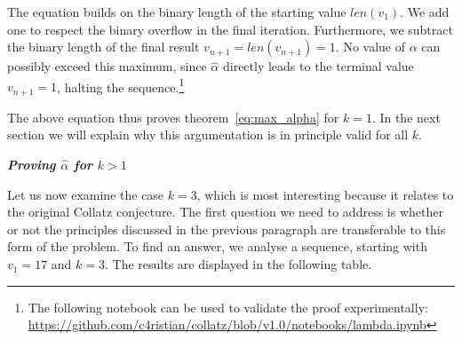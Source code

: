 \documentclass{SciPress_2015}
\renewcommand{\subsection}[1]{\textit{\textbf{#1}}}
\begin{document}
The equation builds on the binary length of the starting value $len(v_1)$. We add one to respect the binary overflow in the final iteration. Furthermore, we subtract the binary length of the final result $v_{n+1}=len(v_{n+1})=1$. No value of $\alpha$ can possibly exceed this maximum, since $\hat\alpha$ directly leads to the terminal value $v_{n+1}=1$, halting the sequence.\footnote{The following notebook can be used to validate the proof experimentally:\\ \hspace*{7mm}\url{https://github.com/c4ristian/collatz/blob/v1.0/notebooks/lambda.ipynb}}

\par\medskip
The above equation thus proves theorem~\ref{eq:max_alpha} for $k=1$. In the next section we will explain why this argumentation is in principle valid for all $k$.

\vspace{1em}\noindent
\subsection{Proving \boldmath$\hat\alpha$ for \boldmath$k>1$}
\par\noindent
Let us now examine the case $k=3$, which is most interesting because it relates to the original Collatz conjecture. The first question we need to address is whether or not the principles discussed in the previous paragraph are transferable to this form of the problem. To find an answer, we analyse a sequence, starting with $v_1=17$ and $k=3$. The results are displayed in the following table.
\end{document}

